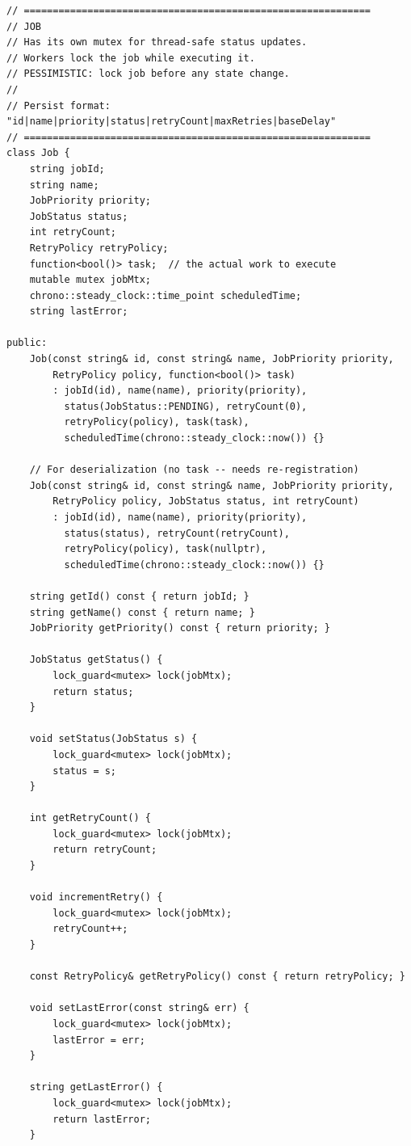 \documentclass[11pt,a4paper]{article}
\begin{document}
\begin{lstlisting}[title={\texttt{models.hpp}}]
// ============================================================
// JOB
// Has its own mutex for thread-safe status updates.
// Workers lock the job while executing it.
// PESSIMISTIC: lock job before any state change.
//
// Persist format: "id|name|priority|status|retryCount|maxRetries|baseDelay"
// ============================================================
class Job {
    string jobId;
    string name;
    JobPriority priority;
    JobStatus status;
    int retryCount;
    RetryPolicy retryPolicy;
    function<bool()> task;  // the actual work to execute
    mutable mutex jobMtx;
    chrono::steady_clock::time_point scheduledTime;
    string lastError;

public:
    Job(const string& id, const string& name, JobPriority priority,
        RetryPolicy policy, function<bool()> task)
        : jobId(id), name(name), priority(priority),
          status(JobStatus::PENDING), retryCount(0),
          retryPolicy(policy), task(task),
          scheduledTime(chrono::steady_clock::now()) {}

    // For deserialization (no task -- needs re-registration)
    Job(const string& id, const string& name, JobPriority priority,
        RetryPolicy policy, JobStatus status, int retryCount)
        : jobId(id), name(name), priority(priority),
          status(status), retryCount(retryCount),
          retryPolicy(policy), task(nullptr),
          scheduledTime(chrono::steady_clock::now()) {}

    string getId() const { return jobId; }
    string getName() const { return name; }
    JobPriority getPriority() const { return priority; }

    JobStatus getStatus() {
        lock_guard<mutex> lock(jobMtx);
        return status;
    }

    void setStatus(JobStatus s) {
        lock_guard<mutex> lock(jobMtx);
        status = s;
    }

    int getRetryCount() {
        lock_guard<mutex> lock(jobMtx);
        return retryCount;
    }

    void incrementRetry() {
        lock_guard<mutex> lock(jobMtx);
        retryCount++;
    }

    const RetryPolicy& getRetryPolicy() const { return retryPolicy; }

    void setLastError(const string& err) {
        lock_guard<mutex> lock(jobMtx);
        lastError = err;
    }

    string getLastError() {
        lock_guard<mutex> lock(jobMtx);
        return lastError;
    }


\end{lstlisting}
\end{document}
